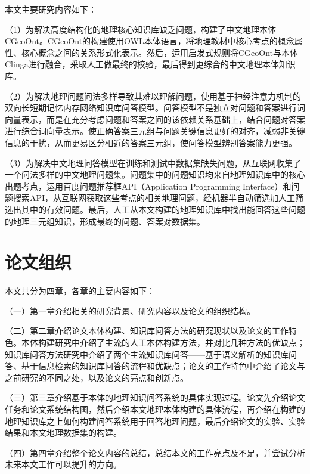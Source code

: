 本文主要研究内容如下：

（1）为解决高度结构化的地理核心知识库缺乏问题，构建了中文地理本体CGeoOnt。CGeoOnt的构建使用OWL本体语言，将地理教材中核心考点的概念属性、核心概念之间的关系形式化表示。然后，运用启发式规则将CGeoOnt与本体Clinga进行融合，采取人工做最终的校验，最后得到更综合的中文地理本体知识库。

（2）为解决地理问题问法多样导致其难以理解问题，使用基于神经注意力机制的双向长短期记忆内存网络知识库问答模型。问答模型不是独立对问题和答案进行词向量表示，而是在充分考虑问题和答案之间的该依赖关系基础上，结合问题对答案进行综合词向量表示。使正确答案三元组与问题关键信息更好的对齐，减弱非关键信息的干扰，从而更易区分相近的答案三元组，使问答模型辨别答案能力更强。

（3）为解决中文地理问答模型在训练和测试中数据集缺失问题，从互联网收集了一个问法多样的中文地理问题集。问题集中的问题知识均来自地理知识库中的核心出题考点，运用百度问题推荐框API（Application Programming Interface）和问题搜索API，从互联网获取这些考点的相关地理问题，经机器半自动筛选加人工筛选出其中的有效问题。最后，人工从本文构建的地理知识库中找出能回答这些问题的地理三元组知识，形成最终的问题、答案对数据集。

\section{论文组织}
本文共分为四章，各章的主要内容如下：

（一）第一章介绍相关的研究背景、研究内容以及论文的组织结构。

（二）第二章介绍论文本体构建、知识库问答方法的研究现状以及论文的工作特色。本体构建研究中介绍了主流的人工本体构建方法，并对比几种方法的优缺点；知识库问答方法研究中介绍了两个主流知识库问答——基于语义解析的知识库问答、基于信息检索的知识库问答的流程和优缺点；论文的工作特色中介绍了论文与之前研究的不同之处，以及论文的亮点和创新点。

（三）第三章介绍基于本体的地理知识问答系统的具体实现过程。论文先介绍论文任务和论文系统结构图，然后介绍本文地理本体构建的具体流程，再介绍在构建的地理知识库之上如何构建问答系统用于回答地理问题，最后介绍论文的实验、实验结果和本文地理数据集的构建。

（四）第四章介绍整个论文内容的总结，总结本文的工作亮点及不足，并尝试分析未来本文工作可以提升的方向。